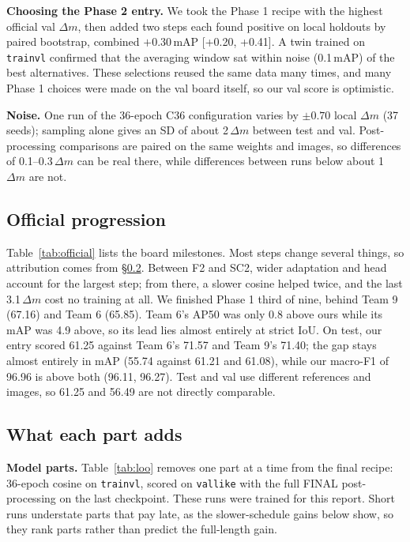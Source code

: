\documentclass[10pt,twocolumn,letterpaper]{article}
\newcommand{\dm}{\ensuremath{\Delta m}}
\begin{document}
\textbf{Choosing the Phase 2 entry.} We took the Phase 1 recipe with the highest official val \dm{}, then added two steps each found positive on local holdouts by paired bootstrap, combined $+0.30$\,mAP [+0.20, +0.41]. A twin trained on \texttt{trainvl} confirmed that the averaging window sat within noise (0.1\,mAP) of the best alternatives. These selections reused the same data many times, and many Phase 1 choices were made on the val board itself, so our val score is optimistic.

\textbf{Noise.} One run of the 36-epoch C36 configuration varies by $\pm0.70$ local \dm{} (37 seeds); sampling alone gives an SD of about 2\,\dm{} between test and val. Post-processing comparisons are paired on the same weights and images, so differences of 0.1--0.3\,\dm{} can be real there, while differences between runs below about 1\,\dm{} are not.

\subsection{Official progression}
Table~\ref{tab:official} lists the board milestones. Most steps change several things, so attribution comes from \S\ref{sec:abl}. Between F2 and SC2, wider adaptation and head account for the largest step; from there, a slower cosine helped twice, and the last 3.1\,\dm{} cost no training at all. We finished Phase 1 third of nine, behind Team 9 (67.16) and Team 6 (65.85). Team 6's AP50 was only 0.8 above ours while its mAP was 4.9 above, so its lead lies almost entirely at strict IoU. On test, our entry scored 61.25 against Team 6's 71.57 and Team 9's 71.40; the gap stays almost entirely in mAP (55.74 against 61.21 and 61.08), while our macro-F1 of 96.96 is above both (96.11, 96.27). Test and val use different references and images, so 61.25 and 56.49 are not directly comparable.



\subsection{What each part adds}
\label{sec:abl}
\textbf{Model parts.} Table~\ref{tab:loo} removes one part at a time from the final recipe: 36-epoch cosine on \texttt{trainvl}, scored on \texttt{vallike} with the full FINAL post-processing on the last checkpoint. These runs were trained for this report. Short runs understate parts that pay late, as the slower-schedule gains below show, so they rank parts rather than predict the full-length gain.
\end{document}
